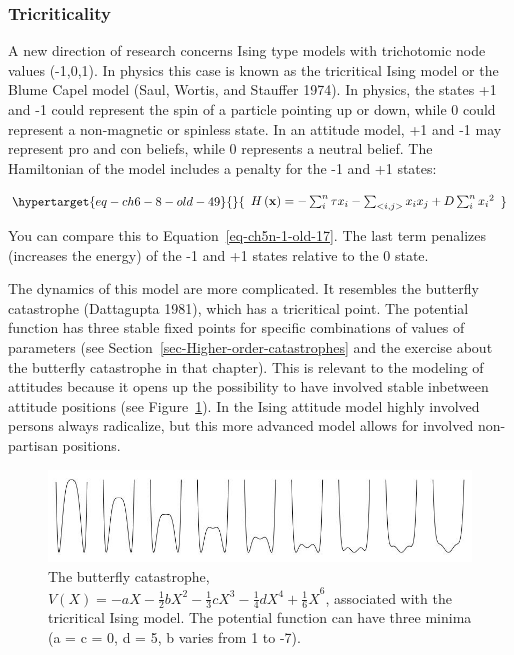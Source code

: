 \documentclass[
  a4paper,
  DIV=11,
  numbers=noendperiod]{scrreprt}
\begin{document}
\hypertarget{sec-Tricriticality}{%
\subsubsection{Tricriticality}\label{sec-Tricriticality}}

A new direction of research concerns Ising type models with trichotomic
node values (-1,0,1). In physics this case is known as the tricritical
Ising model or the Blume Capel model (Saul, Wortis, and Stauffer 1974).
In physics, the states +1 and -1 could represent the spin of a particle
pointing up or down, while 0 could represent a non-magnetic or spinless
state. In an attitude model, +1 and -1 may represent pro and con
beliefs, while 0 represents a neutral belief. The Hamiltonian of the
model includes a penalty for the -1 and +1 states:

\begin{equation}\protect\hypertarget{eq-ch6-8-old-49}{}{\begin{array}{r}
H\left( \mathbf{x} \right) = - \sum_{i}^{n}{\tau x_{i}} - \sum_{< i,j >}^{}{x_{i}x_{j}} + D\sum_{i}^{n}{x_{i}}^{2}
\end{array}}\label{eq-ch6-8-old-49}\end{equation}

You can compare this to Equation~\ref{eq-ch5n-1-old-17}. The last term
penalizes (increases the energy) of the -1 and +1 states relative to the
0 state.

The dynamics of this model are more complicated. It resembles the
butterfly catastrophe (Dattagupta 1981), which has a tricritical point.
The potential function has three stable fixed points for specific
combinations of values of parameters (see
Section~\ref{sec-Higher-order-catastrophes} and the exercise about the
butterfly catastrophe in that chapter). This is relevant to the modeling
of attitudes because it opens up the possibility to have involved stable
inbetween attitude positions (see Figure~\ref{fig-ch6-img15-old-84}). In
the Ising attitude model highly involved persons always radicalize, but
this more advanced model allows for involved non-partisan positions.

\begin{figure}

{\centering \includegraphics{media/ch6/image15.jpg}

}

\caption{\label{fig-ch6-img15-old-84}The butterfly catastrophe,
\(V(X) = {- aX - \frac{1}{2}bX^{2} - \frac{1}{3}cX^{3} - \frac{1}{4}dX^{4} + \frac{1}{6}X}^{6}\),
associated with the tricritical Ising model. The potential function can
have three minima (a = c = 0, d = 5, b varies from 1 to -7).}

\end{figure}
\end{document}
